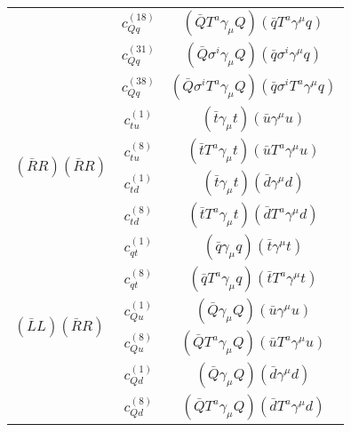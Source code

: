 \begin{table}
\begin{minipage}[t]{0.49\textwidth}
{\begin{tabular}{l|c|c}
                                                        & $c^{(18)}_{Qq}$        & $(\bar{Q} T^a\gamma_\mu Q)(\bar{q} T^a\gamma^\mu q)$                    \\
                                                        & $c^{(31)}_{Qq}$        & $(\bar{Q} \sigma^i\gamma_\mu Q)(\bar{q} \sigma^i\gamma^\mu q)$          \\
                                                        & $c^{(38)}_{Qq}$        & $(\bar{Q} \sigma^iT^a\gamma_\mu Q)(\bar{q} \sigma^iT^a\gamma^\mu q)$    \\
                \midrule
                \multirow{4}{*}{$(\bar{R}R)(\bar{R}R)$} & $c^{(1)}_{tu}$         & $(\bar{t} \gamma_\mu t)(\bar{u} \gamma^\mu u)$                          \\
                                                        & $c^{(8)}_{tu}$         & $(\bar{t} T^a\gamma_\mu t)(\bar{u} T^a\gamma^\mu u)$                    \\
                                                        & $c^{(1)}_{td}$         & $(\bar{t} \gamma_\mu t)(\bar{d} \gamma^\mu d)$                          \\
                                                        & $c^{(8)}_{td}$         & $(\bar{t} T^a\gamma_\mu t)(\bar{d} T^a\gamma^\mu d)$                    \\
                \midrule
                \multirow{6}{*}{$(\bar{L}L)(\bar{R}R)$} & $c^{(1)}_{qt}$         & $(\bar{q} \gamma_\mu q)(\bar{t} \gamma^\mu t)$                          \\
                                                        & $c^{(8)}_{qt}$         & $(\bar{q} T^a\gamma_\mu q)(\bar{t} T^a\gamma^\mu t)$                    \\
                                                        & $c^{(1)}_{Qu}$         & $(\bar{Q} \gamma_\mu Q)(\bar{u} \gamma^\mu u)$                          \\
                                                        & $c^{(8)}_{Qu}$         & $(\bar{Q} T^a\gamma_\mu Q)(\bar{u} T^a\gamma^\mu u)$                    \\
                                                        & $c^{(1)}_{Qd}$         & $(\bar{Q} \gamma_\mu Q)(\bar{d} \gamma^\mu d)$                          \\
                                                        & $c^{(8)}_{Qd}$         & $(\bar{Q} T^a\gamma_\mu Q)(\bar{d} T^a\gamma^\mu d)$                    \\
                \bottomrule
            \end{tabular}
        }
    \end{minipage}



    
\end{table}
